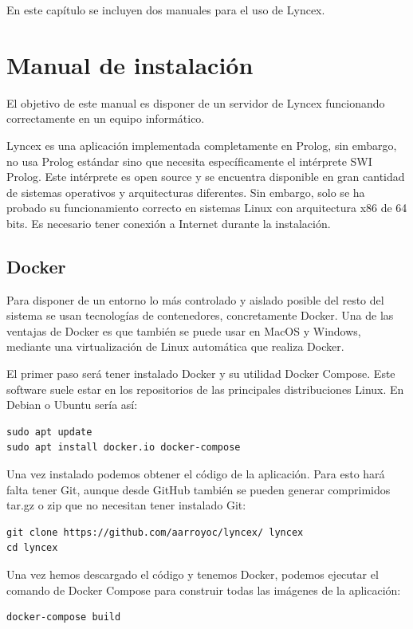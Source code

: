 \documentclass[12pt]{report} %
\begin{document}
En este capítulo se incluyen dos manuales para el uso de Lyncex.

\section{Manual de instalación}

El objetivo de este manual es disponer de un servidor de Lyncex funcionando correctamente en un equipo informático.

Lyncex es una aplicación implementada completamente en Prolog, sin embargo, no usa Prolog estándar sino que necesita específicamente el intérprete SWI Prolog. Este intérprete es open source y se encuentra disponible en gran cantidad de sistemas operativos y arquitecturas diferentes. Sin embargo, solo se ha probado su funcionamiento correcto en sistemas Linux con arquitectura x86 de 64 bits. Es necesario tener conexión a Internet durante la instalación.

\subsection{Docker}

Para disponer de un entorno lo más controlado y aislado posible del resto del sistema se usan tecnologías de contenedores, concretamente Docker. Una de las ventajas de Docker es que también se puede usar en MacOS y Windows, mediante una virtualización de Linux automática que realiza Docker.

El primer paso será tener instalado Docker y su utilidad Docker Compose. Este software suele estar en los repositorios de las principales distribuciones Linux. En Debian o Ubuntu sería así:
\begin{verbatim}
sudo apt update
sudo apt install docker.io docker-compose
\end{verbatim}

Una vez instalado podemos obtener el código de la aplicación. Para esto hará falta tener Git, aunque desde GitHub también se pueden generar comprimidos tar.gz o zip que no necesitan tener instalado Git:
\begin{verbatim}
git clone https://github.com/aarroyoc/lyncex/ lyncex
cd lyncex
\end{verbatim}

Una vez hemos descargado el código y tenemos Docker, podemos ejecutar el comando de Docker Compose para construir todas las imágenes de la aplicación:
\begin{verbatim}
docker-compose build
\end{verbatim}
\end{document}
